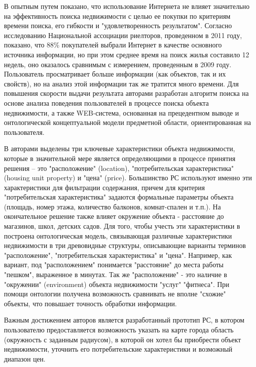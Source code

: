 \documentclass[a4paper,14pt,openany,final]{extreport} %
\begin{document}
В \cite{Yuan} опытным путем показано, что использование Интернета не влияет значительно на эффективность поиска недвижимости с целью ее покупки по критериям времени поиска, его гибкости и "удовлетворенность результатом". Согласно исследованию Национальной ассоциации риелторов, проведенном в 2011 году, показано, что 88\% покупателей выбрали Интернет в качестве основного источника информации, но при этом среднее время на поиск жилья составило 12 недель, оно оказалось сравнимым с измерением, проведенным в 2009 году. Пользователь просматривает больше информации (как объектов, так и их свойств), но на анализ этой информации так же тратится много времени. Для повышения скорости выдачи результата авторами разработан алгоритм поиска на основе анализа поведения пользователей в процессе поиска объекта недвижимости, а также WEB-система, основанная на прецедентном выводе и онтологической концептуальной модели предметной области, ориентированная на пользователя.

В \cite{Yuan} авторами выделены три ключевые характеристики объекта недвижимости, которые в значительной мере является определяющими в процессе принятия решения – это "расположение" (location), "потребительская характеристика" (housing unit property) и "цена" (price). Большинство РС используют именно эти характеристики для фильтрации содержания, причем для критерия "потребительская характеристика" задаются формальные параметры объекта (площадь, номер этажа, количество балконов, комнат-спален и т.п.). На окончательное решение также влияет окружение объекта - расстояние до магазинов, школ, детских садов. Для того, чтобы учесть эти характеристики в \cite{Yuan} построена онтологическая модель, связывающая различные характеристики недвижимости в три древовидные структуры, описывающие варианты терминов "расположение", "потребительская характеристика" и "цена". Например, как вариант, под "расположением" понимается "расстояние" до места работы "пешком", выраженное в минутах. Так же "расположение" - это наличие в "окружении" (environment) объекта недвижимости "услуг" "фитнеса". При помощи онтологии получена возможность сравнивать не вполне "схожие" объекты, что повышает точность обработки информации.

Важным достижением авторов \cite{Yuan} является разработанный прототип РС, в котором пользователю предоставляется возможность указать на карте города область (окружность с заданным радиусом), в которой он хотел бы приобрести объект недвижимости, уточнить его потребительские характеристики и возможный диапазон цен.
\end{document}
